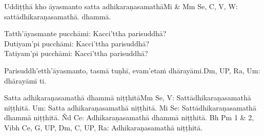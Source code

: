 \begin{center}
	Uddiṭṭhā kho āyasmanto satta adhikaraṇasamathā\makeatletter\hyperlink{endnote-appendix}\makeatother Mi & Mm Se, C, V, W: sattādhikaraṇasamathā. dhammā.

	\smallskip

	Tatth'āyasmante pucchāmi: Kacci'ttha parisuddhā?\\
	Dutiyam'pi pucchāmi: Kacci'ttha parisuddhā?\\
	Tatiyam'pi pucchāmi: Kacci'ttha parisuddhā?

	\smallskip

	Parisuddh'etth'āyasmanto, tasmā tuṇhī, evam'etaṁ dhārayāmi.\makeatletter\hyperlink{endnote-appendix}\makeatother Dm, UP, Ra, Um: dhārayāmī ti.
\end{center}

\begin{outro}
	Satta adhikaraṇasamathā dhammā niṭṭhitā\makeatletter\hyperlink{endnote-appendix}\makeatother Mm Se, V: Sattādhikaraṇasamathā niṭṭhitā. Um: Satta adhikaraṇasamathā niṭṭhitā. Mi Se: Sattādhikaraṇasamathā dhammā niṭṭhitā.
Ñd Ce: Adhikaraṇasamathā dhammā niṭṭhitā. Bh Pm 1 & 2, Vibh Ce, G, UP, Dm, C, UP, Ra: Adhikaraṇasamathā niṭṭhitā.
\end{outro}

\clearpage

